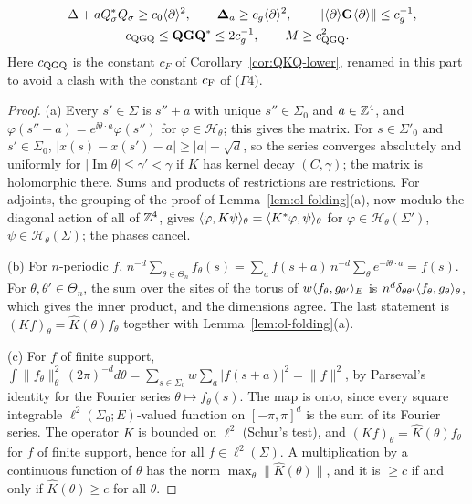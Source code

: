 \begin{lemma}
\begin{enumerate}[label=(\alph*)]
\[
\begin{gathered}
-\Delta+aQ_\sigma^*Q_\sigma\ge c_0\langle\partial\rangle^2,\qquad\boldsymbol{\Delta}_a\ge c_g\langle\partial\rangle^2,\qquad\|\langle\partial\rangle\mathbf G\langle\partial\rangle\|\le c_g^{-1},\\
c_{\rm QGQ}\le\mathbf Q\mathbf G\mathbf Q^*\le2c_g^{-1},\qquad M\ge c_{\rm QGQ}^2 .
\end{gathered}
\]
Here $c_{\rm QGQ}$ is the constant $c_F$ of Corollary~\ref{cor:QKQ-lower}, renamed in this part to avoid a clash with the constant $c_{\rm F}$ of ($\Gamma$4).
\end{enumerate}
\end{lemma}

\begin{proof}
(a) Every $s'\in\Sigma$ is $s''+a$ with unique $s''\in\Sigma_0$ and $a\in\mathbb Z^4$, and $\varphi(s''+a)=e^{\ii\theta\cdot a}\varphi(s'')$ for $\varphi\in\mathcal H_\theta$; this gives the matrix. For $s\in\Sigma'_0$ and $s'\in\Sigma_0$, $|x(s)-x(s')-a|\ge|a|-\sqrt d$, so the series converges absolutely and uniformly for $|\operatorname{Im}\theta|\le\gamma'<\gamma$ if $K$ has kernel decay $(C,\gamma)$; the matrix is holomorphic there. Sums and products of restrictions are restrictions. For adjoints, the grouping of the proof of Lemma~\ref{lem:ol-folding}(a), now modulo the diagonal action of all of $\mathbb Z^4$, gives $\langle \varphi,K\psi\rangle_\theta=\langle K^*\varphi,\psi\rangle_\theta$ for $\varphi\in\mathcal H_\theta(\Sigma')$, $\psi\in\mathcal H_\theta(\Sigma)$; the phases cancel.

(b) For $n$-periodic $f$, $n^{-d}\sum_{\theta\in\Theta_n}f_\theta(s)=\sum_{a}f(s+a)\,n^{-d}\sum_\theta e^{-\ii\theta\cdot a}=f(s)$. For $\theta,\theta'\in\Theta_n$, the sum over the sites of the torus of $w\langle f_\theta,g_{\theta'}\rangle_E$ is $n^d\delta_{\theta\theta'}\langle f_\theta,g_\theta\rangle_\theta$, which gives the inner product, and the dimensions agree. The last statement is $(Kf)_\theta=\hat K(\theta)f_\theta$ together with Lemma~\ref{lem:ol-folding}(a).

(c) For $f$ of finite support, $\int\|f_\theta\|_\theta^2\,(2\pi)^{-d}d\theta=\sum_{s\in\Sigma_0}w\sum_a|f(s+a)|^2=\|f\|^2$, by Parseval's identity for the Fourier series $\theta\mapsto f_\theta(s)$. The map is onto, since every square integrable $\ell^2(\Sigma_0;E)$-valued function on $[-\pi,\pi]^d$ is the sum of its Fourier series. The operator $K$ is bounded on $\ell^2$ (Schur's test), and $(Kf)_\theta=\hat K(\theta)f_\theta$ for $f$ of finite support, hence for all $f\in\ell^2(\Sigma)$. A multiplication by a continuous function of $\theta$ has the norm $\max_\theta\|\hat K(\theta)\|$, and it is $\ge c$ if and only if $\hat K(\theta)\ge c$ for all $\theta$.


\end{proof}
